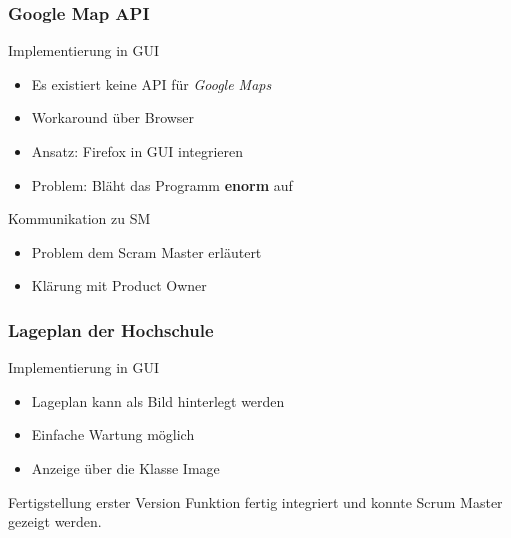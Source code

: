 \begin{frame}
	\frametitle{Google Map API}
%
	\begin{block}{Implementierung in GUI}
		\begin{itemize}
			\item Es existiert keine API für \textit{Google Maps}
			\item Workaround über Browser
			\item Ansatz: Firefox in GUI integrieren
			\item Problem: Bläht das Programm \textbf{enorm} auf
		\end{itemize}
	\end{block}
%
	\begin{block}{Kommunikation zu SM}
		\begin{itemize}
			\item Problem dem Scram Master erläutert
			\item Klärung mit Product Owner
		\end{itemize}
	\end{block}
\end{frame}
%
%
%
\begin{frame}
	\frametitle{Lageplan der Hochschule}
%
	\begin{block}{Implementierung in GUI}
		\begin{itemize}
			\item Lageplan kann als Bild hinterlegt werden
			\item Einfache Wartung möglich
			\item Anzeige über die Klasse Image
		\end{itemize}
	\end{block}
%
	\begin{block}{Fertigstellung erster Version}
		Funktion fertig integriert und konnte Scrum Master gezeigt werden.	
	\end{block}
\end{frame}